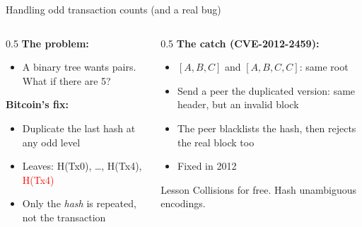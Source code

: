 \ifdefined\PRESENTATION\else\PassOptionsToClass{handout}{beamer}\fi\documentclass[aspectratio=169, lualatex]{beamer}
\begin{document}
\begin{frame}{Handling odd transaction counts (and a real bug)}
	\begin{columns}[c]
		\begin{column}{0.5\textwidth}
			\textbf{The problem:}
			\begin{itemize}
				\item A binary tree wants pairs. What if there are 5?
			\end{itemize}
			\textbf{Bitcoin's fix:}
			\begin{itemize}
				\item Duplicate the last hash at any odd level
				\item Leaves: H(Tx0), \ldots, H(Tx4), \textcolor{red}{H(Tx4)}
				\item Only the \emph{hash} is repeated, not the transaction
			\end{itemize}
		\end{column}
		\begin{column}{0.5\textwidth}
			\textbf{The catch (CVE-2012-2459):}
			\begin{itemize}
				\item $[A,B,C]$ and $[A,B,C,C]$: same root
				\item Send a peer the duplicated version: same header, but an invalid block
				\item The peer blacklists the hash, then rejects the real block too
				\item Fixed in 2012
			\end{itemize}
			\begin{alertblock}{Lesson}
				Collisions for free. Hash unambiguous encodings.
			\end{alertblock}
		\end{column}
	\end{columns}
\end{frame}
\end{document}
